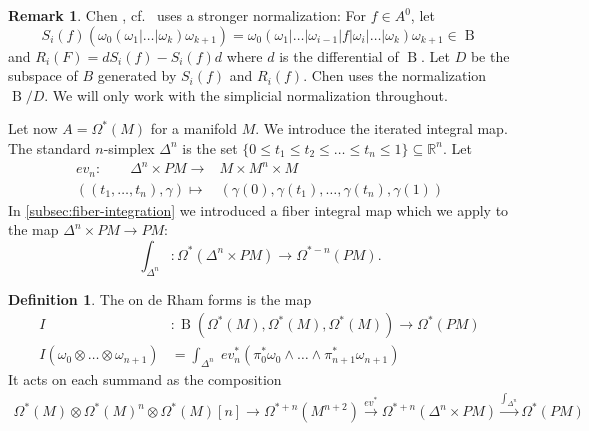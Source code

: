 \documentclass{scrartcl}
\let\emph\relax
\theoremstyle{plain}
\theoremstyle{definition}
\newtheorem{definition}[theorem]{Definition}
\newtheorem{remark}[theorem]{Remark}
\newcommand{\R}{\mathbb R}
\newcommand{\abs}[1]{\left\lvert#1\right\rvert}
\renewcommand{\subset}{\subseteq}
\let\xto\xrightarrow
\DeclareMathOperator{\BC}{B}
\begin{document}
\begin{remark}
Chen \cite{chen1976reduced}, cf.\ \cite{getzler1991differential} uses a stronger normalization: For $f\in A^0$, let $$S_i(f)\left(\omega_0(\omega_1| \dots| \omega_k)\omega_{k+1}\right) = \omega_0(\omega_1| \dots |\omega_{i-1}| f | \omega_i| \dots| \omega_k)\omega_{k+1}\in \BC$$ and $R_i(F) = d S_i(f) - S_i(f) d$ where $d$ is the differential of $\BC$. Let $D$ be the subspace of $B$ generated by $S_i(f)$ and $R_i(f)$. Chen uses the normalization $\BC/D$. We will only work with the simplicial normalization throughout. 
\end{remark}

Let now $A=\Omega^*(M)$ for a manifold $M$. We introduce the iterated integral map. The standard $n$-simplex $\Delta^n$ is the set $\{0\leq t_1\leq t_2\leq \dots\leq t_n\leq 1\} \subset \R^n$. Let 
\begin{align*}
    ev_n\colon\qquad\Delta^n\times PM \to & M\times M^n\times M \\
    ((t_1,\dots, t_n), \gamma)\mapsto &(\gamma(0), \gamma(t_1), \dots, \gamma(t_n), \gamma(1))
\end{align*}
In \cref{subsec:fiber-integration} we introduced a fiber integral map which we apply to the map $\Delta^n \times PM \to PM$: 
$$\int_{\Delta^n}\colon \Omega^*(\Delta^n \times PM) \to \Omega^{*-n}(PM).$$

\begin{definition}
The \emph{iterated integral} on de Rham forms is the map 
\begin{align*}
    I&\colon \BC(\Omega^*(M), \Omega^*(M), \Omega^*(M)) \to \Omega^*(PM) \\
    I(\omega_0 \otimes \dots \otimes\omega_{n+1}) &= \int_{\Delta^n}\phantom{|} ev_n^*(\pi_0^*\omega_0\wedge\dots\wedge\pi_{n+1}^*\omega_{n+1})
\end{align*}
It acts on each summand as the composition
\begin{align*}
    \Omega^*(M)\otimes\Omega^*(M)^n\otimes\Omega^*(M)[n]\to \Omega^{*+n}(M^{n+2})\xto{ev^*}\Omega^{*+n}(\Delta^n\times PM) \xto{\int_{\Delta^n}} \Omega^{*}(PM)
\end{align*}
\end{definition}
\end{document}
